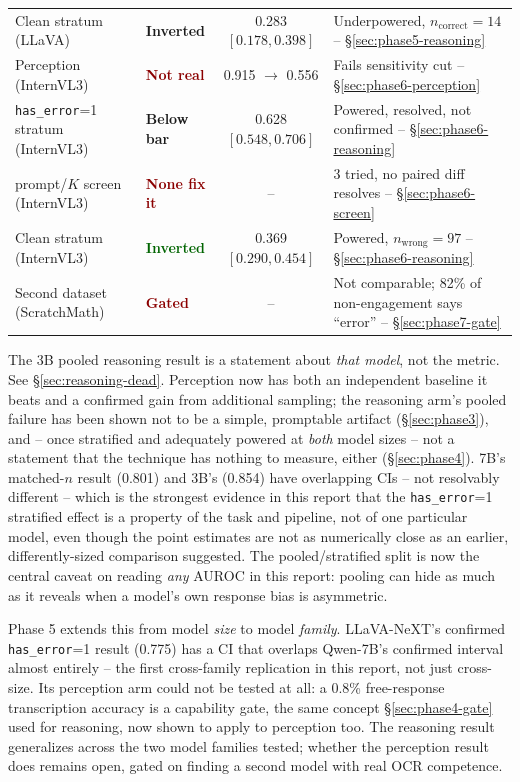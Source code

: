 \documentclass[11pt]{article}
\newcommand{\worked}[1]{\textcolor{darkgreen}{\textbf{#1}}}
\newcommand{\failed}[1]{\textcolor{darkred}{\textbf{#1}}}
\newcommand{\unresolved}[1]{\textcolor{darkamber}{\textbf{#1}}}
\begin{document}
\begin{center}
\begin{tabular}{llcl}
\quad Clean stratum (LLaVA) & \unresolved{Inverted} & 0.283 $[0.178, 0.398]$ & Underpowered, $n_{\text{correct}}=14$ -- \S\ref{sec:phase5-reasoning} \\
Perception (InternVL3) & \failed{Not real} & 0.915 $\to$ 0.556 & Fails sensitivity cut -- \S\ref{sec:phase6-perception} \\
\quad \texttt{has\_error}=1 stratum (InternVL3) & \unresolved{Below bar} & 0.628 $[0.548, 0.706]$ & Powered, resolved, not confirmed -- \S\ref{sec:phase6-reasoning} \\
\quad prompt/$K$ screen (InternVL3) & \failed{None fix it} & -- & 3 tried, no paired diff resolves -- \S\ref{sec:phase6-screen} \\
\quad Clean stratum (InternVL3) & \worked{Inverted} & 0.369 $[0.290, 0.454]$ & Powered, $n_{\text{wrong}}=97$ -- \S\ref{sec:phase6-reasoning} \\
Second dataset (ScratchMath) & \failed{Gated} & -- & Not comparable; 82\% of non-engagement says ``error'' -- \S\ref{sec:phase7-gate} \\
\bottomrule
\end{tabular}
\end{center}

\noindent The 3B pooled reasoning result is a statement about \emph{that
model}, not the metric. See \S\ref{sec:reasoning-dead}. Perception now has
both an independent baseline it beats and a confirmed gain from additional
sampling; the reasoning arm's pooled failure has been shown not to be a
simple, promptable artifact (\S\ref{sec:phase3}), and -- once stratified and
adequately powered at \emph{both} model sizes -- not a statement that the
technique has nothing to measure, either (\S\ref{sec:phase4}). 7B's
matched-$n$ result (0.801) and 3B's (0.854) have overlapping CIs -- not
resolvably different -- which is the strongest evidence in this report that
the \texttt{has\_error}=1 stratified effect is a property of the task and
pipeline, not of one particular model, even though the point estimates are
not as numerically close as an earlier, differently-sized comparison
suggested. The pooled/stratified split is now the central caveat on
reading \emph{any} AUROC in this report: pooling can hide as much as it
reveals when a model's own response bias is asymmetric.

Phase 5 extends this from model \emph{size} to model \emph{family}.
LLaVA-NeXT's confirmed \texttt{has\_error}=1 result (0.775) has a CI that
overlaps Qwen-7B's confirmed interval almost entirely -- the first
cross-family replication in this report, not just cross-size. Its
perception arm could not be tested at all: a 0.8\% free-response
transcription accuracy is a capability gate, the same concept
\S\ref{sec:phase4-gate} used for reasoning, now shown to apply to
perception too. The reasoning result generalizes across the two
model families tested; whether the perception result does remains open,
gated on finding a second model with real OCR competence.
\end{document}
